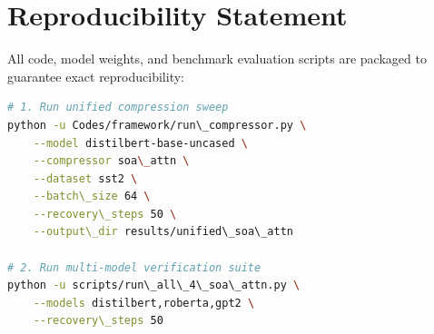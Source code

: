 \section{Reproducibility Statement}
All code, model weights, and benchmark evaluation scripts are packaged to guarantee exact reproducibility:
\begin{lstlisting}[language=bash]
# 1. Run unified compression sweep
python -u Codes/framework/run\_compressor.py \
    --model distilbert-base-uncased \
    --compressor soa\_attn \
    --dataset sst2 \
    --batch\_size 64 \
    --recovery\_steps 50 \
    --output\_dir results/unified\_soa\_attn

# 2. Run multi-model verification suite
python -u scripts/run\_all\_4\_soa\_attn.py \
    --models distilbert,roberta,gpt2 \
    --recovery\_steps 50
\end{lstlisting}
